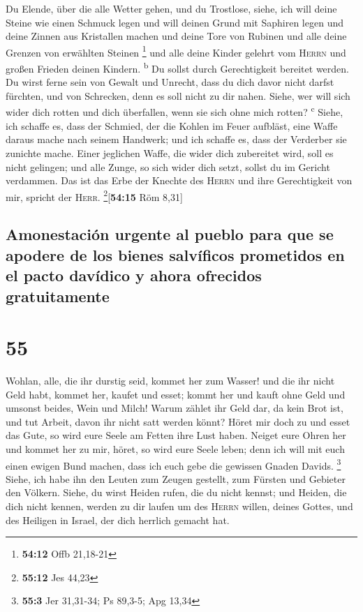  Du Elende, über die alle Wetter gehen, und du Trostlose,
siehe, ich will deine Steine wie einen Schmuck legen und will deinen
Grund mit Saphiren legen  und deine Zinnen aus Kristallen
machen und deine Tore von Rubinen und alle deine Grenzen von erwählten
Steinen \footnote{\textbf{54:12} Offb 21,18-21}  und alle
deine Kinder gelehrt vom \textsc{Herrn} und großen Frieden deinen
Kindern. \textsuperscript{b}  Du sollst durch
Gerechtigkeit bereitet werden. Du wirst ferne sein von Gewalt und
Unrecht, dass du dich davor nicht darfst fürchten, und von Schrecken,
denn es soll nicht zu dir nahen.  Siehe, wer will sich
wider dich rotten und dich überfallen, wenn sie sich ohne mich rotten?
\textsuperscript{c}  Siehe, ich schaffe es, dass der
Schmied, der die Kohlen im Feuer aufbläst, eine Waffe daraus mache nach
seinem Handwerk; und ich schaffe es, dass der Verderber sie zunichte
mache.  Einer jeglichen Waffe, die wider dich zubereitet
wird, soll es nicht gelingen; und alle Zunge, so sich wider dich setzt,
sollst du im Gericht verdammen. Das ist das Erbe der Knechte des
\textsc{Herrn} und ihre Gerechtigkeit von mir, spricht der
\textsc{Herr}. \footnote{\textbf{55:12} Jes 44,23}{[}\textbf{54:15} Röm
8,31{]}

\hypertarget{amonestaciuxf3n-urgente-al-pueblo-para-que-se-apodere-de-los-bienes-salvuxedficos-prometidos-en-el-pacto-davuxeddico-y-ahora-ofrecidos-gratuitamente}{%
\subsection{Amonestación urgente al pueblo para que se apodere de los
bienes salvíficos prometidos en el pacto davídico y ahora ofrecidos
gratuitamente}\label{amonestaciuxf3n-urgente-al-pueblo-para-que-se-apodere-de-los-bienes-salvuxedficos-prometidos-en-el-pacto-davuxeddico-y-ahora-ofrecidos-gratuitamente}}

\hypertarget{section-54}{%
\section{55}\label{section-54}}

 Wohlan, alle, die ihr durstig seid, kommet her zum
Wasser! und die ihr nicht Geld habt, kommet her, kaufet und esset; kommt
her und kauft ohne Geld und umsonst beides, Wein und Milch!
 Warum zählet ihr Geld dar, da kein Brot ist, und tut
Arbeit, davon ihr nicht satt werden könnt? Höret mir doch zu und esset
das Gute, so wird eure Seele am Fetten ihre Lust haben. 
Neiget eure Ohren her und kommet her zu mir, höret, so wird eure Seele
leben; denn ich will mit euch einen ewigen Bund machen, dass ich euch
gebe die gewissen Gnaden Davids. \footnote{\textbf{55:3} Jer 31,31-34;
  Ps 89,3-5; Apg 13,34}  Siehe, ich habe ihn den Leuten
zum Zeugen gestellt, zum Fürsten und Gebieter den Völkern.
 Siehe, du wirst Heiden rufen, die du nicht kennst; und
Heiden, die dich nicht kennen, werden zu dir laufen um des
\textsc{Herrn} willen, deines Gottes, und des Heiligen in Israel, der
dich herrlich gemacht hat.

